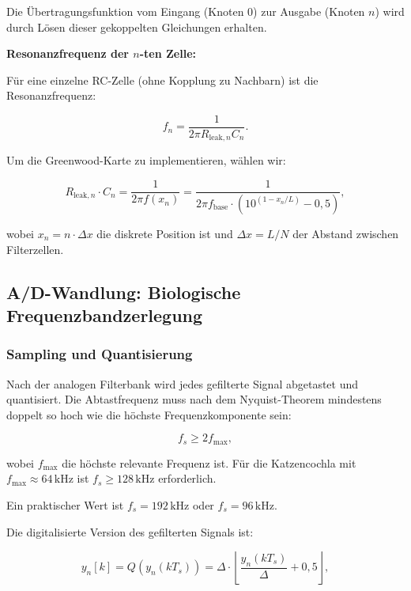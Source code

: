 ﻿\documentclass[12pt, a4paper]{article}
\theoremstyle{definition}
\theoremstyle{remark}
\begin{document}
Die Übertragungsfunktion vom Eingang (Knoten 0) zur Ausgabe (Knoten $n$) wird 
durch Lösen dieser gekoppelten Gleichungen erhalten.

\textbf{Resonanzfrequenz der $n$-ten Zelle:}

Für eine einzelne RC-Zelle (ohne Kopplung zu Nachbarn) ist die Resonanzfrequenz:

\begin{equation}
\label{eq:rc_resonance_freq}
f_n = \frac{1}{2\pi R_{\mathrm{leak},n} C_n}.
\end{equation}

Um die Greenwood-Karte zu implementieren, wählen wir:

\begin{equation}
\label{eq:rc_param_choice}
R_{\mathrm{leak},n} \cdot C_n = \frac{1}{2\pi f(x_n)} 
= \frac{1}{2\pi f_{\mathrm{base}} \cdot \left( 10^{(1-x_n/L)} - 0{,}5 \right)},
\end{equation}

wobei $x_n = n \cdot \Delta x$ die diskrete Position ist und $\Delta x = L/N$ 
der Abstand zwischen Filterzellen.

\subsection{A/D-Wandlung: Biologische Frequenzbandzerlegung}

\subsubsection{Sampling und Quantisierung}

Nach der analogen Filterbank wird jedes gefilterte Signal abgetastet und 
quantisiert. Die Abtastfrequenz muss nach dem Nyquist-Theorem mindestens 
doppelt so hoch wie die höchste Frequenzkomponente sein:

\begin{equation}
\label{eq:nyquist_criterion}
f_s \geq 2 f_{\max},
\end{equation}

wobei $f_{\max}$ die höchste relevante Frequenz ist. Für die Katzencochla mit 
$f_{\max} \approx 64\,\mathrm{kHz}$ ist $f_s \geq 128\,\mathrm{kHz}$ erforderlich.

Ein praktischer Wert ist $f_s = 192\,\mathrm{kHz}$ oder $f_s = 96\,\mathrm{kHz}$.

Die digitalisierte Version des gefilterten Signals ist:

\begin{equation}
\label{eq:digitized_signal}
y_n[k] = Q\left( y_n(k T_s) \right) = \Delta \cdot \left\lfloor 
\frac{y_n(k T_s)}{\Delta} + 0{,}5 \right\rfloor,
\end{equation}
\end{document}
